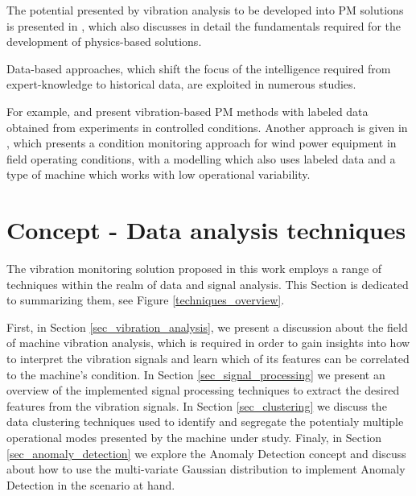 \documentclass[conference]{IEEEtran}
\begin{document}
The potential presented by vibration analysis to be developed into PM solutions is presented in \cite{b1}, which also discusses in detail the fundamentals required for the development of physics-based solutions.

Data-based approaches, which shift the focus of the intelligence required from expert-knowledge to historical data, are exploited in numerous studies. 


For example, \cite{wu2017remaining} and \cite{li2020lifelong} present vibration-based PM methods with labeled data obtained from experiments in controlled conditions. Another approach is given in \cite{cui2018anomaly}, which presents a condition monitoring approach for wind power equipment in field operating conditions, with a modelling which also uses labeled data and a type of machine which works with low operational variability.





\section{Concept - Data analysis techniques}
\label{sec_concept}

The vibration monitoring solution proposed in this work employs a range of techniques within the realm of data and signal analysis. This Section is dedicated to summarizing them, see Figure \ref{techniques_overview}. 

First, in Section \ref{sec_vibration_analysis}, we present a discussion about the field of machine vibration analysis, which is required in order to gain insights into how to interpret the vibration signals and learn which of its features can be correlated to the machine's condition. In Section \ref{sec_signal_processing} we present an overview of the implemented signal processing techniques to extract the desired features from the vibration signals. In Section \ref{sec_clustering} we discuss the data clustering techniques used to identify and segregate the potentialy multiple operational modes presented by the machine under study. Finaly, in Section \ref{sec_anomaly_detection} we explore the Anomaly Detection concept and discuss about how to use the multi-variate Gaussian distribution to implement Anomaly Detection in the scenario at hand.
\end{document}
